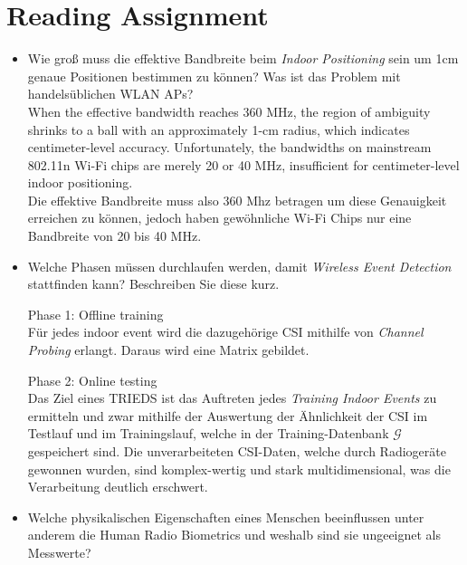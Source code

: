 \section{Reading Assignment}

\begin{itemize}
    \item Wie groß muss die effektive 
    Bandbreite beim \textit{Indoor Positioning} 
    sein um 1cm genaue Positionen bestimmen 
    zu können? Was ist das Problem mit 
    handelsüblichen WLAN APs?\\

    \glqq When the effective bandwidth reaches 
    360 MHz, the region of ambiguity shrinks to 
    a ball with an approximately 1-cm radius,
    which indicates centimeter-level accuracy.
    Unfortunately, the bandwidths on mainstream 
    802.11n Wi-Fi chips are merely 20 or 40 MHz, 
    insufficient for centimeter-level indoor 
    positioning.\grqq\\
    Die effektive Bandbreite muss also 360 Mhz 
    betragen um diese Genauigkeit erreichen zu 
    können, jedoch haben gewöhnliche Wi-Fi Chips 
    nur eine Bandbreite  von 20 bis 40 MHz.\\[1mm]

    \item Welche Phasen müssen durchlaufen 
    werden, damit \textit{Wireless Event Detection}
    stattfinden kann?
    Beschreiben Sie diese kurz.


    Phase 1: Offline training\\
    Für jedes indoor event wird die dazugehörige CSI 
    mithilfe von \textit{Channel Probing} erlangt. Daraus wird
    eine Matrix gebildet.
    

    Phase 2: Online testing\\
    Das Ziel eines TRIEDS ist das Auftreten jedes \textit{
    Training Indoor Events} zu ermitteln und zwar mithilfe 
    der Auswertung der Ähnlichkeit der CSI im Testlauf und
    im Trainingslauf, welche in der Training-Datenbank 
    \( \mathcal{G} \) gespeichert sind.
    Die unverarbeiteten CSI-Daten, welche durch 
    Radiogeräte gewonnen wurden, sind komplex-wertig 
    und stark multidimensional, was die Verarbeitung 
    deutlich erschwert.\\[1mm]

    \item Welche physikalischen Eigenschaften eines 
    Menschen beeinflussen unter anderem die Human
    Radio Biometrics und weshalb sind sie ungeeignet 
    als Messwerte?


\end{itemize}
